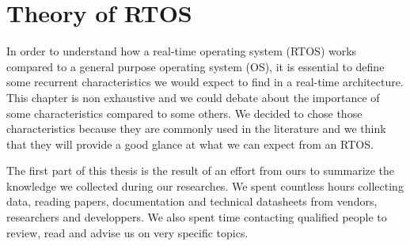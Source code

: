 \chapter{Theory of RTOS\label{part:rtos-theory}}

In order to understand how a real-time operating system (RTOS) works compared to a general purpose operating system (OS),
    it is essential to define some recurrent characteristics we would expect to find in a real-time architecture.
\\
This chapter is non exhaustive and we could debate about the importance of some characteristics compared to some others.
We decided to chose those characteristics because they are commonly used in the literature
    and we think that they will provide a good glance at what we can expect from an RTOS.

The first part of this thesis is the result of an effort from ours to summarize the knowledge we collected during our researches.
We spent countless hours collecting data, reading papers, documentation and technical datasheets from vendors, researchers and developpers.
We also spent time contacting qualified people to review, read and advise us on very specific topics.











